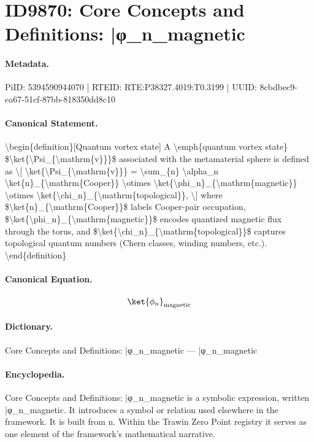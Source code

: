 \section*{ID9870: Core Concepts and Definitions: |φ\_n\_magnetic}
\paragraph{Metadata.}
PiID: 5394590944070 | RTEID: RTE:P38327.4019:T0.3199 | UUID: 8cbdbec9-ea67-51cf-87bb-818350dd8c10

\paragraph{Canonical Statement.}
\textbackslash{}begin\{definition\}[Quantum vortex state] A \textbackslash{}emph\{quantum vortex state\} \$\textbackslash{}ket\{\textbackslash{}Psi\_\{\textbackslash{}mathrm\{v\}\}\}\$ associated with the metamaterial sphere is defined as \textbackslash{}[ \textbackslash{}ket\{\textbackslash{}Psi\_\{\textbackslash{}mathrm\{v\}\}\} = \textbackslash{}sum\_\{n\} \textbackslash{}alpha\_n \textbackslash{}ket\{n\}\_\{\textbackslash{}mathrm\{Cooper\}\} \textbackslash{}otimes \textbackslash{}ket\{\textbackslash{}phi\_n\}\_\{\textbackslash{}mathrm\{magnetic\}\} \textbackslash{}otimes \textbackslash{}ket\{\textbackslash{}chi\_n\}\_\{\textbackslash{}mathrm\{topological\}\}, \textbackslash{}] where \$\textbackslash{}ket\{n\}\_\{\textbackslash{}mathrm\{Cooper\}\}\$ labels Cooper-pair occupation, \$\textbackslash{}ket\{\textbackslash{}phi\_n\}\_\{\textbackslash{}mathrm\{magnetic\}\}\$ encodes quantized magnetic flux through the torus, and \$\textbackslash{}ket\{\textbackslash{}chi\_n\}\_\{\textbackslash{}mathrm\{topological\}\}\$ captures topological quantum numbers (Chern classes, winding numbers, etc.). \textbackslash{}end\{definition\}

\paragraph{Canonical Equation.}
\[
\ket{\phi_n}_{\mathrm{magnetic}}
\]

\paragraph{Dictionary.}
Core Concepts and Definitions: |φ\_n\_magnetic — |φ\_n\_magnetic

\paragraph{Encyclopedia.}
Core Concepts and Definitions: |φ\_n\_magnetic is a symbolic expression, written |φ\_n\_magnetic. It introduces a symbol or relation used elsewhere in the framework. It is built from n. Within the Trawin Zero Point registry it serves as one element of the framework's mathematical narrative.
